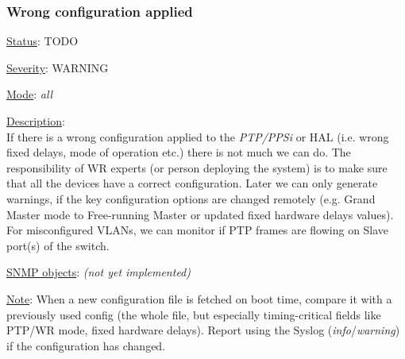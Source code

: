 \subsubsection{\bf Wrong configuration applied}
		\label{fail:timing:wrong_config}
		\begin{pck_descr}
			\item [] \underline{Status}: TODO
			\item [] \underline{Severity}: WARNING
			\item [] \underline{Mode}: \emph{all}
			\item [] \underline{Description}:\\
				If there is a wrong configuration applied to the \emph{PTP/PPSi} or HAL
				(i.e.  wrong fixed delays, mode of operation etc.) there is not much we
				can do. The responsibility of WR experts (or person deploying the
				system) is to make sure that all the devices have a correct
				configuration. Later we can only generate warnings, if the key
				configuration options are changed remotely (e.g. Grand Master mode to
				Free-running Master or updated fixed hardware delays values).\\
				For misconfigured VLANs, we can monitor if PTP frames are flowing on
				Slave port(s) of the switch.
			\item [] \underline{SNMP objects}: \emph{(not yet implemented)}
			\item [] \underline{Note}: When a new configuration file is fetched on
        boot time, compare it with a previously used config (the whole file,
        but especially timing-critical fields like PTP/WR mode, fixed hardware
        delays). Report using the Syslog (\emph{info}/\emph{warning}) if the
        configuration has changed.
    \end{pck_descr}

